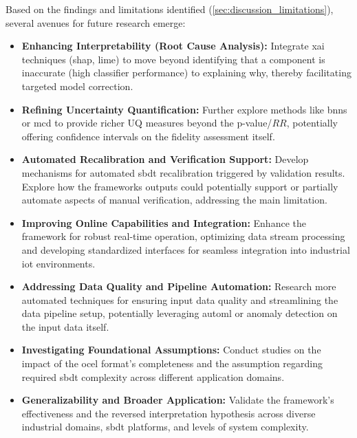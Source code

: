 Based on the findings and limitations identified (\autoref{sec:discussion_limitations}), several avenues for future research emerge:

\begin{itemize}
  \item \textbf{Enhancing Interpretability (Root Cause Analysis):} Integrate \gls{xai} techniques (\gls{shap}, \gls{lime}) to move beyond identifying that a component is inaccurate (high classifier performance) to explaining why, thereby facilitating targeted model correction.
  \item \textbf{Refining Uncertainty Quantification:} Further explore methods like \gls{bnn}s or \gls{mcd} to provide richer UQ measures beyond the p-value/$RR$, potentially offering confidence intervals on the fidelity assessment itself.
  \item \textbf{Automated Recalibration and Verification Support:} Develop mechanisms for automated \gls{sbdt} recalibration triggered by validation results. Explore how the frameworks outputs could potentially support or partially automate aspects of manual verification, addressing the main limitation.
  \item \textbf{Improving Online Capabilities and Integration:} Enhance the framework for robust real-time operation, optimizing data stream processing and developing standardized interfaces for seamless integration into industrial \gls{iot} environments.
  \item \textbf{Addressing Data Quality and Pipeline Automation:} Research more automated techniques for ensuring input data quality and streamlining the data pipeline setup, potentially leveraging \gls{automl} or anomaly detection on the input data itself.
  \item \textbf{Investigating Foundational Assumptions:} Conduct studies on the impact of the \gls{ocel} format's completeness and the assumption regarding required \gls{sbdt} complexity across different application domains.
  \item \textbf{Generalizability and Broader Application:} Validate the framework's effectiveness and the reversed interpretation hypothesis across diverse industrial domains, \gls{sbdt} platforms, and levels of system complexity.

\end{itemize}
